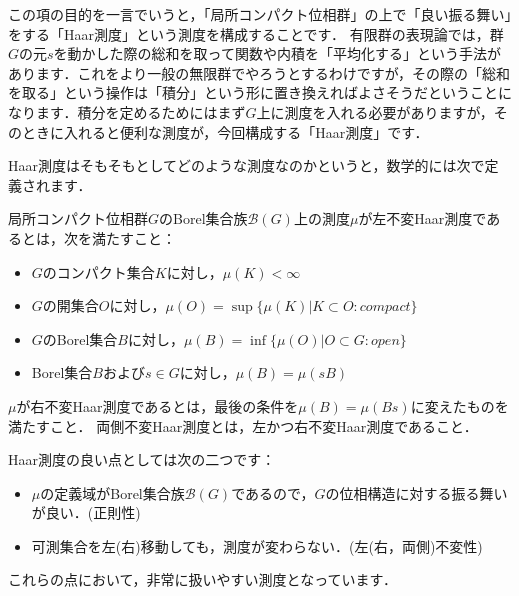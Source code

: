 

この項の目的を一言でいうと，「局所コンパクト位相群」の上で「良い振る舞い」をする「Haar測度」という測度を構成することです．
有限群の表現論では，群$G$の元$s$を動かした際の総和を取って関数や内積を「平均化する」という手法があります．これをより一般の無限群でやろうとするわけですが，その際の「総和を取る」という操作は「積分」という形に置き換えればよさそうだということになります．積分を定めるためにはまず$G$上に測度を入れる必要がありますが，そのときに入れると便利な測度が，今回構成する「Haar測度」です．

Haar測度はそもそもとしてどのような測度なのかというと，数学的には次で定義されます．
\begin{defi}[Haar測度]\label{1}
局所コンパクト位相群$G$のBorel集合族$\mathscr{B}(G)$上の測度$\mu$が左不変Haar測度であるとは，次を満たすこと：
\begin{itemize}
 \item $G$のコンパクト集合$K$に対し，$\mu(K) < \infty$
 \item $G$の開集合$O$に対し，$\mu(O)=\sup \{ \mu(K) | K \subset O \colon compact \}$
 \item $G$のBorel集合$B$に対し，$\mu(B)=\inf \{ \mu(O) | O \subset G \colon open \}$
 \item Borel集合$B$および$s \in G$に対し，$\mu (B) = \mu (sB)$
\end{itemize}
$\mu$が右不変Haar測度であるとは，最後の条件を$\mu (B) = \mu (Bs)$に変えたものを満たすこと．
両側不変Haar測度とは，左かつ右不変Haar測度であること．
\end{defi}
Haar測度の良い点としては次の二つです：
\begin{itemize}
 \item $\mu$の定義域がBorel集合族$\mathscr{B}(G)$であるので，$G$の位相構造に対する振る舞いが良い．(正則性)
 \item 可測集合を左(右)移動しても，測度が変わらない．(左(右，両側)不変性)
\end{itemize}
これらの点において，非常に扱いやすい測度となっています．

